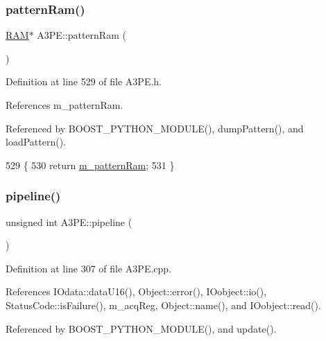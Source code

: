 \subsubsection{\texorpdfstring{pattern\+Ram()}{patternRam()}}
{\footnotesize\ttfamily \hyperlink{classRAM}{R\+AM}$\ast$ A3\+P\+E\+::pattern\+Ram (\begin{DoxyParamCaption}{ }\end{DoxyParamCaption})\hspace{0.3cm}{\ttfamily [inline]}}



Definition at line 529 of file A3\+P\+E.\+h.



References m\+\_\+pattern\+Ram.



Referenced by B\+O\+O\+S\+T\+\_\+\+P\+Y\+T\+H\+O\+N\+\_\+\+M\+O\+D\+U\+L\+E(), dump\+Pattern(), and load\+Pattern().


\begin{DoxyCode}
529                    \{
530     \textcolor{keywordflow}{return} \hyperlink{classA3PE_a84d5deabbbf2d513144dd6a00390182e}{m\_patternRam};
531   \}
\end{DoxyCode}
\mbox{\label{classA3PE_aeb22b2fcba4d14f234ad2d6dcef7948c}} 
\subsubsection{\texorpdfstring{pipeline()}{pipeline()}}
{\footnotesize\ttfamily unsigned int A3\+P\+E\+::pipeline (\begin{DoxyParamCaption}{ }\end{DoxyParamCaption})}



Definition at line 307 of file A3\+P\+E.\+cpp.



References I\+Odata\+::data\+U16(), Object\+::error(), I\+Oobject\+::io(), Status\+Code\+::is\+Failure(), m\+\_\+acq\+Reg, Object\+::name(), and I\+Oobject\+::read().



Referenced by B\+O\+O\+S\+T\+\_\+\+P\+Y\+T\+H\+O\+N\+\_\+\+M\+O\+D\+U\+L\+E(), and update().


